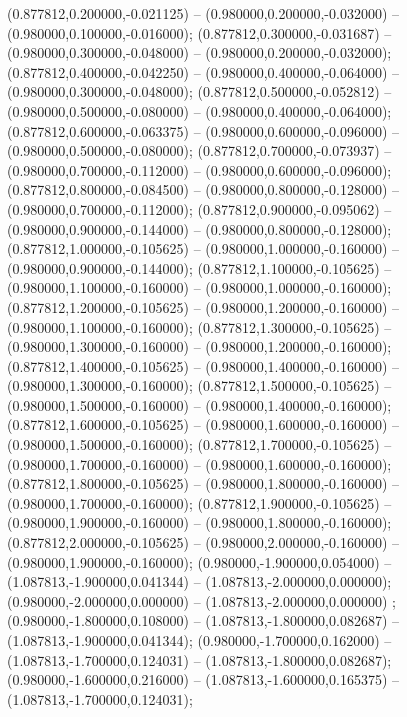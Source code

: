  (0.877812,0.200000,-0.021125) -- (0.980000,0.200000,-0.032000) -- (0.980000,0.100000,-0.016000);
 (0.877812,0.300000,-0.031687) -- (0.980000,0.300000,-0.048000) -- (0.980000,0.200000,-0.032000);
 (0.877812,0.400000,-0.042250) -- (0.980000,0.400000,-0.064000) -- (0.980000,0.300000,-0.048000);
 (0.877812,0.500000,-0.052812) -- (0.980000,0.500000,-0.080000) -- (0.980000,0.400000,-0.064000);
 (0.877812,0.600000,-0.063375) -- (0.980000,0.600000,-0.096000) -- (0.980000,0.500000,-0.080000);
 (0.877812,0.700000,-0.073937) -- (0.980000,0.700000,-0.112000) -- (0.980000,0.600000,-0.096000);
 (0.877812,0.800000,-0.084500) -- (0.980000,0.800000,-0.128000) -- (0.980000,0.700000,-0.112000);
 (0.877812,0.900000,-0.095062) -- (0.980000,0.900000,-0.144000) -- (0.980000,0.800000,-0.128000);
 (0.877812,1.000000,-0.105625) -- (0.980000,1.000000,-0.160000) -- (0.980000,0.900000,-0.144000);
 (0.877812,1.100000,-0.105625) -- (0.980000,1.100000,-0.160000) -- (0.980000,1.000000,-0.160000);
 (0.877812,1.200000,-0.105625) -- (0.980000,1.200000,-0.160000) -- (0.980000,1.100000,-0.160000);
 (0.877812,1.300000,-0.105625) -- (0.980000,1.300000,-0.160000) -- (0.980000,1.200000,-0.160000);
 (0.877812,1.400000,-0.105625) -- (0.980000,1.400000,-0.160000) -- (0.980000,1.300000,-0.160000);
 (0.877812,1.500000,-0.105625) -- (0.980000,1.500000,-0.160000) -- (0.980000,1.400000,-0.160000);
 (0.877812,1.600000,-0.105625) -- (0.980000,1.600000,-0.160000) -- (0.980000,1.500000,-0.160000);
 (0.877812,1.700000,-0.105625) -- (0.980000,1.700000,-0.160000) -- (0.980000,1.600000,-0.160000);
 (0.877812,1.800000,-0.105625) -- (0.980000,1.800000,-0.160000) -- (0.980000,1.700000,-0.160000);
 (0.877812,1.900000,-0.105625) -- (0.980000,1.900000,-0.160000) -- (0.980000,1.800000,-0.160000);
 (0.877812,2.000000,-0.105625) -- (0.980000,2.000000,-0.160000) -- (0.980000,1.900000,-0.160000);
 (0.980000,-1.900000,0.054000) -- (1.087813,-1.900000,0.041344) -- (1.087813,-2.000000,0.000000);
 (0.980000,-2.000000,0.000000) -- (1.087813,-2.000000,0.000000) ;
 (0.980000,-1.800000,0.108000) -- (1.087813,-1.800000,0.082687) -- (1.087813,-1.900000,0.041344);
 (0.980000,-1.700000,0.162000) -- (1.087813,-1.700000,0.124031) -- (1.087813,-1.800000,0.082687);
 (0.980000,-1.600000,0.216000) -- (1.087813,-1.600000,0.165375) -- (1.087813,-1.700000,0.124031);
